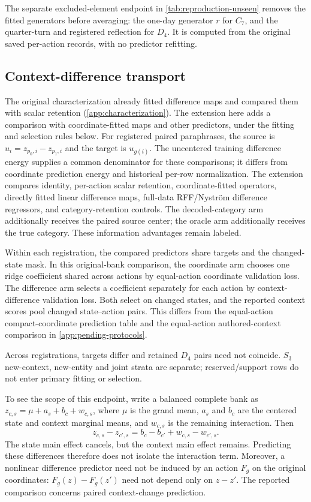 
The separate excluded-element endpoint in \cref{tab:reproduction-unseen} removes the fitted generators before averaging: the one-day generator $r$ for $C_7$, and the quarter-turn and registered reflection for $D_4$. It is computed from the original saved per-action records, with no predictor refitting.

\subsection{Context-difference transport}

The original characterization already fitted difference maps and compared them with scalar retention (\cref{app:characterization}). The extension here adds a comparison with coordinate-fitted maps and other predictors, under the fitting and selection rules below. For registered paired paraphrases, the source is $u_i=z_{p_0,i}-z_{p_1,i}$ and the target is $u_{g(i)}$. The uncentered training difference energy supplies a common denominator for these comparisons; it differs from coordinate prediction energy and historical per-row normalization. The extension compares identity, per-action scalar retention, coordinate-fitted operators, directly fitted linear difference maps, full-data RFF/Nystr\"om difference regressors, and category-retention controls. The decoded-category arm additionally receives the paired source center; the oracle arm additionally receives the true category. These information advantages remain labeled.

Within each registration, the compared predictors share targets and the changed-state mask. In this original-bank comparison, the coordinate arm chooses one ridge coefficient shared across actions by equal-action coordinate validation loss. The difference arm selects a coefficient separately for each action by context-difference validation loss. Both select on changed states, and the reported context scores pool changed state--action pairs. This differs from the equal-action compact-coordinate prediction table and the equal-action authored-context comparison in \cref{app:pending-protocols}.

Across registrations, targets differ and retained $D_4$ pairs need not coincide. $S_3$ new-context, new-entity and joint strata are separate; reserved/support rows do not enter primary fitting or selection.

To see the scope of this endpoint, write a balanced complete bank as $z_{c,s}=\mu+a_s+b_c+w_{c,s}$, where $\mu$ is the grand mean, $a_s$ and $b_c$ are the centered state and context marginal means, and $w_{c,s}$ is the remaining interaction. Then
\[
 z_{c,s}-z_{c',s}=b_c-b_{c'}+w_{c,s}-w_{c',s}.
\]
The state main effect cancels, but the context main effect remains. Predicting these differences therefore does not isolate the interaction term. Moreover, a nonlinear difference predictor need not be induced by an action $F_g$ on the original coordinates: $F_g(z)-F_g(z')$ need not depend only on $z-z'$. The reported comparison concerns paired context-change prediction.

